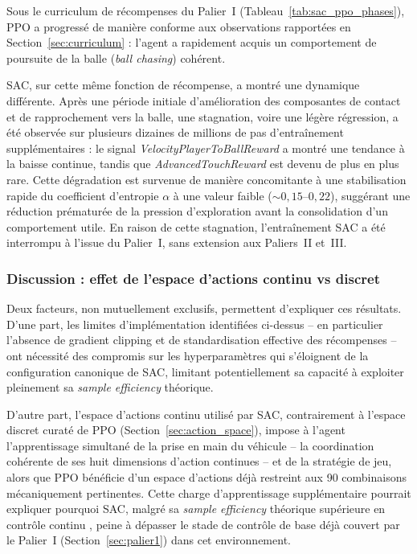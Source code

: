 Sous le curriculum de récompenses du Palier~I (Tableau~\ref{tab:sac_ppo_phases}), PPO a progressé de manière conforme aux observations rapportées en Section~\ref{sec:curriculum} : l'agent a rapidement acquis un comportement de poursuite de la balle (\textit{ball chasing}) cohérent.

SAC, sur cette même fonction de récompense, a montré une dynamique différente. Après une période initiale d'amélioration des composantes de contact et de rapprochement vers la balle, une stagnation, voire une légère régression, a été observée sur plusieurs dizaines de millions de pas d'entraînement supplémentaires : le signal \textit{VelocityPlayerToBallReward} a montré une tendance à la baisse continue, tandis que \textit{AdvancedTouchReward} est devenu de plus en plus rare. Cette dégradation est survenue de manière concomitante à une stabilisation rapide du coefficient d'entropie $\alpha$ à une valeur faible ($\sim 0,15$--$0,22$), suggérant une réduction prématurée de la pression d'exploration avant la consolidation d'un comportement utile. En raison de cette stagnation, l'entraînement SAC a été interrompu à l'issue du Palier~I, sans extension aux Paliers~II et~III.

\subsubsection{Discussion : effet de l'espace d'actions continu vs discret}
\label{sec:discussion:continu-vs-discret}

Deux facteurs, non mutuellement exclusifs, permettent d'expliquer ces résultats. D'une part, les limites d'implémentation identifiées ci-dessus -- en particulier l'absence de gradient clipping et de standardisation effective des récompenses -- ont nécessité des compromis sur les hyperparamètres qui s'éloignent de la configuration canonique de SAC, limitant potentiellement sa capacité à exploiter pleinement sa \textit{sample efficiency} théorique.

D'autre part, l'espace d'actions continu utilisé par SAC, contrairement à l'espace discret curaté de PPO (Section~\ref{sec:action_space}), impose à l'agent l'apprentissage simultané de la prise en main du véhicule -- la coordination cohérente de ses huit dimensions d'action continues -- et de la stratégie de jeu, alors que PPO bénéficie d'un espace d'actions déjà restreint aux 90 combinaisons mécaniquement pertinentes. Cette charge d'apprentissage supplémentaire pourrait expliquer pourquoi SAC, malgré sa \textit{sample efficiency} théorique supérieure en contrôle continu \parencite{haarnojaSoftActorCriticOffPolicy2018}, peine à dépasser le stade de contrôle de base déjà couvert par le Palier~I (Section~\ref{sec:palier1}) dans cet environnement.

